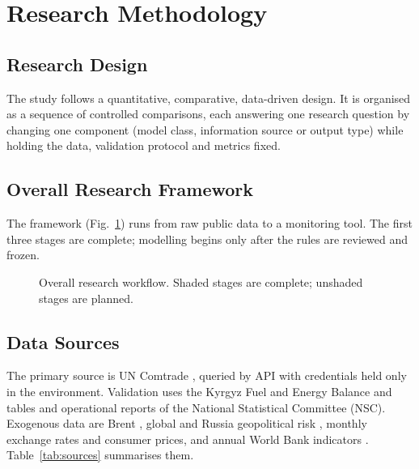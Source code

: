 \documentclass[conference]{IEEEtran}
\begin{document}
\section{Research Methodology}\label{sec:method}

\subsection{Research Design}
The study follows a quantitative, comparative, data-driven design. It is organised as a sequence of controlled comparisons, each answering one research question by changing one component (model class, information source or output type) while holding the data, validation protocol and metrics fixed.

\subsection{Overall Research Framework}
The framework (Fig.~\ref{fig:workflow}) runs from raw public data to a monitoring tool. The first three stages are complete; modelling begins only after the rules are reviewed and frozen.

\begin{figure}[t]
\centering
{}
\caption{Overall research workflow. Shaded stages are complete; unshaded stages are planned.}
\label{fig:workflow}
\end{figure}

\subsection{Data Sources}
The primary source is UN Comtrade \cite{comtrade}, queried by API with credentials held only in the environment. Validation uses the Kyrgyz Fuel and Energy Balance \cite{nsc_balance} and tables and operational reports of the National Statistical Committee (NSC). Exogenous data are Brent \cite{eia_brent}, global and Russia geopolitical risk \cite{caldara2022}, monthly exchange rates and consumer prices, and annual World Bank indicators \cite{wdi}. Table~\ref{tab:sources} summarises them.
\end{document}
